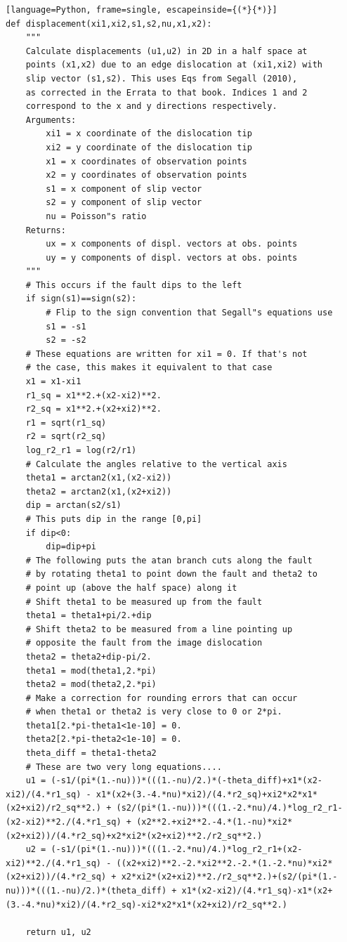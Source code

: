 \documentclass[a4paper , 12pt]{book}
\begin{document}
\begin{center}
\begin{lstlisting}[language=Python, frame=single, escapeinside={(*}{*)}]
def displacement(xi1,xi2,s1,s2,nu,x1,x2):
	"""
	Calculate displacements (u1,u2) in 2D in a half space at
	points (x1,x2) due to an edge dislocation at (xi1,xi2) with 
	slip vector (s1,s2). This uses Eqs from Segall (2010), 
	as corrected in the Errata to that book. Indices 1 and 2 
	correspond to the x and y directions respectively.
	Arguments:
		xi1 = x coordinate of the dislocation tip 
		xi2 = y coordinate of the dislocation tip 
		x1 = x coordinates of observation points 
		x2 = y coordinates of observation points 
		s1 = x component of slip vector 
		s2 = y component of slip vector 
		nu = Poisson"s ratio 
	Returns:
		ux = x components of displ. vectors at obs. points 
		uy = y components of displ. vectors at obs. points 
	"""
	# This occurs if the fault dips to the left
	if sign(s1)==sign(s2): 
		# Flip to the sign convention that Segall"s equations use
		s1 = -s1
		s2 = -s2
	# These equations are written for xi1 = 0. If that's not 
	# the case, this makes it equivalent to that case
	x1 = x1-xi1 
	r1_sq = x1**2.+(x2-xi2)**2.
	r2_sq = x1**2.+(x2+xi2)**2.
	r1 = sqrt(r1_sq)
	r2 = sqrt(r2_sq)
	log_r2_r1 = log(r2/r1)
	# Calculate the angles relative to the vertical axis
	theta1 = arctan2(x1,(x2-xi2))
	theta2 = arctan2(x1,(x2+xi2))
	dip = arctan(s2/s1)
	# This puts dip in the range [0,pi]
	if dip<0:
		dip=dip+pi 
	# The following puts the atan branch cuts along the fault 
	# by rotating theta1 to point down the fault and theta2 to 
	# point up (above the half space) along it
	# Shift theta1 to be measured up from the fault
	theta1 = theta1+pi/2.+dip
	# Shift theta2 to be measured from a line pointing up 
	# opposite the fault from the image dislocation
	theta2 = theta2+dip-pi/2. 
	theta1 = mod(theta1,2.*pi)
	theta2 = mod(theta2,2.*pi)
	# Make a correction for rounding errors that can occur 
	# when theta1 or theta2 is very close to 0 or 2*pi.
	theta1[2.*pi-theta1<1e-10] = 0.
	theta2[2.*pi-theta2<1e-10] = 0.
	theta_diff = theta1-theta2
	# These are two very long equations....
	u1 = (-s1/(pi*(1.-nu)))*(((1.-nu)/2.)*(-theta_diff)+x1*(x2-xi2)/(4.*r1_sq) - x1*(x2+(3.-4.*nu)*xi2)/(4.*r2_sq)+xi2*x2*x1*(x2+xi2)/r2_sq**2.) + (s2/(pi*(1.-nu)))*(((1.-2.*nu)/4.)*log_r2_r1-(x2-xi2)**2./(4.*r1_sq) + (x2**2.+xi2**2.-4.*(1.-nu)*xi2*(x2+xi2))/(4.*r2_sq)+x2*xi2*(x2+xi2)**2./r2_sq**2.)
	u2 = (-s1/(pi*(1.-nu)))*(((1.-2.*nu)/4.)*log_r2_r1+(x2-xi2)**2./(4.*r1_sq) - ((x2+xi2)**2.-2.*xi2**2.-2.*(1.-2.*nu)*xi2*(x2+xi2))/(4.*r2_sq) + x2*xi2*(x2+xi2)**2./r2_sq**2.)+(s2/(pi*(1.-nu)))*(((1.-nu)/2.)*(theta_diff) + x1*(x2-xi2)/(4.*r1_sq)-x1*(x2+(3.-4.*nu)*xi2)/(4.*r2_sq)-xi2*x2*x1*(x2+xi2)/r2_sq**2.)
	
	return u1, u2
\end{lstlisting}
\end{center}
\end{document}
